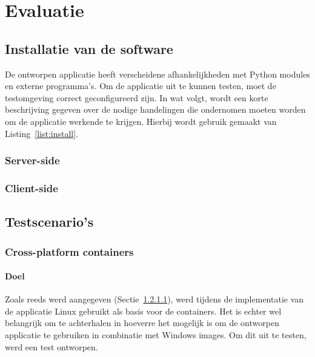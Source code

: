 \chapter{Evaluatie}
\section{Installatie van de software}
De ontworpen applicatie heeft verscheidene afhankelijkheden met Python modules en externe programma's.
Om de applicatie uit te kunnen testen, moet de testomgeving correct geconfigureerd zijn.
In wat volgt, wordt een korte beschrijving gegeven over de nodige handelingen die ondernomen moeten worden om de applicatie werkende te krijgen.
Hierbij wordt gebruik gemaakt van Listing~\ref{list:install}.

\subsection{Server-side}
\subsection{Client-side}

\section{Testscenario's}
\subsection{Cross-platform containers}
\subsubsection{Doel}
Zoals reeds werd aangegeven (Sectie~\ref{}), werd tijdens de implementatie van de applicatie Linux gebruikt als basis voor de containers.
Het is echter wel belangrijk om te achterhalen in hoeverre het mogelijk is om de ontworpen applicatie te gebruiken in combinatie met Windows images.
Om dit uit te testen, werd een test ontworpen.

